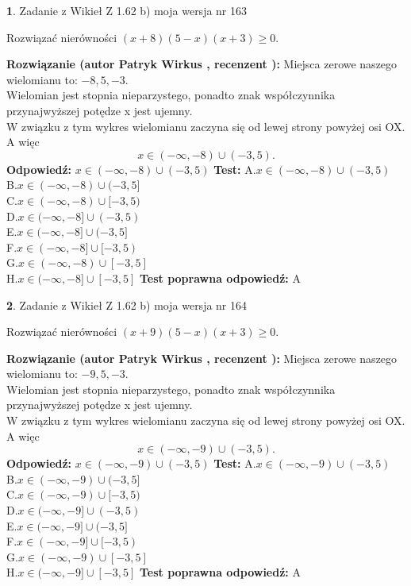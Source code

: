 \documentclass[12pt, a4paper]{article}
\theoremstyle{definition} %
\newtheorem{zad}{}
\newcommand{\zadStart}[1]{\begin{zad}#1\newline}
\newcommand{\zadStop}{\end{zad}}
\newcommand{\rozwStart}[2]{\noindent \textbf{Rozwiązanie (autor #1 , recenzent #2): }\newline}
\newcommand{\rozwStop}{\newline}
\newcommand{\odpStart}{\noindent \textbf{Odpowiedź:}\newline}
\newcommand{\odpStop}{\newline}
\newcommand{\testStart}{\noindent \textbf{Test:}\newline}
\newcommand{\testStop}{\newline}
\newcommand{\kluczStart}{\noindent \textbf{Test poprawna odpowiedź:}\newline}
\newcommand{\kluczStop}{\newline}
\begin{document}
\zadStart{Zadanie z Wikieł Z 1.62 b) moja wersja nr 163}

Rozwiązać nierówności $(x+8)(5-x)(x+3)\ge0$.
\zadStop
\rozwStart{Patryk Wirkus}{}
Miejsca zerowe naszego wielomianu to: $-8, 5, -3$.\\
Wielomian jest stopnia nieparzystego, ponadto znak współczynnika przy\linebreak najwyższej potędze x jest ujemny.\\ W związku z tym wykres wielomianu zaczyna się od lewej strony powyżej osi OX. A więc $$x \in (-\infty,-8) \cup (-3,5).$$
\rozwStop
\odpStart
$x \in (-\infty,-8) \cup (-3,5)$
\odpStop
\testStart
A.$x \in (-\infty,-8) \cup (-3,5)$\\
B.$x \in (-\infty,-8) \cup (-3,5]$\\
C.$x \in (-\infty,-8) \cup [-3,5)$\\
D.$x \in (-\infty,-8] \cup (-3,5)$\\
E.$x \in (-\infty,-8] \cup (-3,5]$\\
F.$x \in (-\infty,-8] \cup [-3,5)$\\
G.$x \in (-\infty,-8) \cup [-3,5]$\\
H.$x \in (-\infty,-8] \cup [-3,5]$
\testStop
\kluczStart
A
\kluczStop



\zadStart{Zadanie z Wikieł Z 1.62 b) moja wersja nr 164}

Rozwiązać nierówności $(x+9)(5-x)(x+3)\ge0$.
\zadStop
\rozwStart{Patryk Wirkus}{}
Miejsca zerowe naszego wielomianu to: $-9, 5, -3$.\\
Wielomian jest stopnia nieparzystego, ponadto znak współczynnika przy\linebreak najwyższej potędze x jest ujemny.\\ W związku z tym wykres wielomianu zaczyna się od lewej strony powyżej osi OX. A więc $$x \in (-\infty,-9) \cup (-3,5).$$
\rozwStop
\odpStart
$x \in (-\infty,-9) \cup (-3,5)$
\odpStop
\testStart
A.$x \in (-\infty,-9) \cup (-3,5)$\\
B.$x \in (-\infty,-9) \cup (-3,5]$\\
C.$x \in (-\infty,-9) \cup [-3,5)$\\
D.$x \in (-\infty,-9] \cup (-3,5)$\\
E.$x \in (-\infty,-9] \cup (-3,5]$\\
F.$x \in (-\infty,-9] \cup [-3,5)$\\
G.$x \in (-\infty,-9) \cup [-3,5]$\\
H.$x \in (-\infty,-9] \cup [-3,5]$
\testStop
\kluczStart
A
\kluczStop
\end{document}
